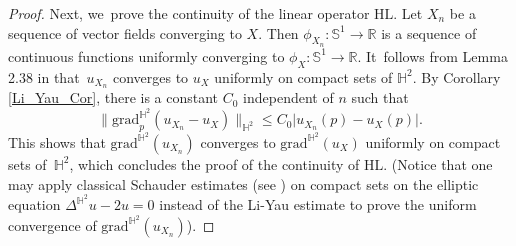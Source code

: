 \documentclass[JEP,XML,SOM,Unicode,NoEqCountersInSection, NoFloatCountersInSection,published]{cedram}
\theoremstyle{plain}
\theoremstyle{definition}
\newcommand{\grad}{\mathrm{grad}^{\mathbb{H}^2}}
\begin{document}
\begin{proof}
Next, we~prove the continuity of the linear operator $\mathrm{HL}$. Let $X_n$ be a sequence of vector fields converging to $X$. Then $\phi_{X_n}:\mathbb{S}^1 \to \mathbb{R}$ is a sequence of continuous functions uniformly converging to $\phi_X:\mathbb{S}^1 \to \mathbb{R}$. It~follows from Lemma 2.38 in \cite{barbotfillastre} that~$u_{X_n}$ converges to $u_X$ uniformly on compact sets of $\mathbb{H}^2$. By Corollary \ref{Li_Yau_Cor}, there is a constant $C_0$ independent of $n$ such that
\[
\lVert \grad_p(u_{X_n}-u_X)\rVert_{\mathbb{H}^2}\leq C_0\lvert u_{X_n}(p)-u_X(p)\rvert.
\]
This shows that $\grad(u_{X_n})$ converges to $\grad(u_X)$ uniformly on compact sets of~$\mathbb{H}^2$, which concludes the proof of the continuity of $\mathrm{HL}$. (Notice that one may apply classical Schauder estimates (see \cite{PDE_Book}) on compact sets on the elliptic equation $\Delta^{\mathbb{H}^2} u - 2u=0$ instead of the Li-Yau estimate to prove the uniform convergence of $\grad(u_{X_n})$).


\end{proof}
\end{document}
